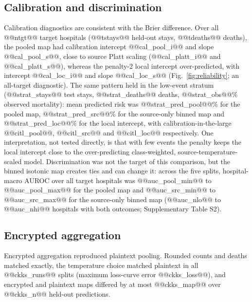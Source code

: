 \documentclass[11pt]{article}
\begin{document}
\subsection*{Calibration and discrimination}
Calibration diagnostics are consistent with the Brier difference. Over all @@ntgt@@ target hospitals (@@tstays@@ held-out stays, @@tdeaths@@ deaths), the pooled map had calibration intercept @@cal_pool_i@@ and slope @@cal_pool_s@@, close to source Platt scaling (@@cal_platt_i@@ and @@cal_platt_s@@), whereas the penalty-2 local intercept over-predicted, with intercept @@cal_loc_i@@ and slope @@cal_loc_s@@ (Fig.~\ref{fig:reliability}; an all-target diagnostic). The same pattern held in the low-event stratum (@@strat_stays@@ test stays, @@strat_deaths@@ deaths, @@strat_obs@@\% observed mortality): mean predicted risk was @@strat_pred_pool@@\% for the pooled map, @@strat_pred_src@@\% for the source-only binned map and @@strat_pred_loc@@\% for the local intercept, with calibration-in-the-large @@citl_pool@@, @@citl_src@@ and @@citl_loc@@ respectively. One interpretation, not tested directly, is that with few events the penalty keeps the local intercept close to the over-predicting class-weighted, source-temperature-scaled model. Discrimination was not the target of this comparison, but the binned isotonic map creates ties and can change it: across the five splits, hospital-macro AUROC over all target hospitals was @@auc_pool_min@@ to @@auc_pool_max@@ for the pooled map and @@auc_src_min@@ to @@auc_src_max@@ for the source-only binned map (@@auc_nlo@@ to @@auc_nhi@@ hospitals with both outcomes; Supplementary Table S2).

\subsection*{Encrypted aggregation}
Encrypted aggregation reproduced plaintext pooling. Rounded counts and deaths matched exactly, the temperature choice matched plaintext in all @@ckks_runs@@ splits (maximum loss-curve error @@ckks_loss@@), and encrypted and plaintext maps differed by at most @@ckks_map@@ over @@ckks_n@@ held-out predictions.
\end{document}
